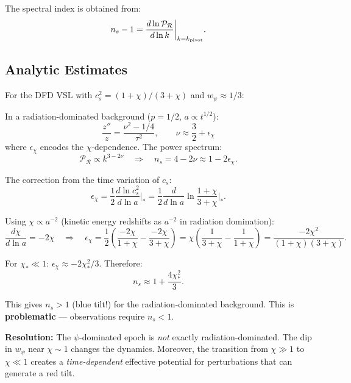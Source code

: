 \documentclass[11pt,a4paper]{article}
\begin{document}
The spectral index is obtained from:
\begin{equation}
n_s - 1 = \frac{d\ln\mathcal{P}_\mathcal{R}}{d\ln k}\bigg|_{k=k_{\rm pivot}}.
\end{equation}

\subsection{Analytic Estimates}

For the DFD VSL with $c_s^2 = (1+\chi)/(3+\chi)$ and $w_\psi \approx 1/3$:

In a radiation-dominated background ($p = 1/2$, $a \propto t^{1/2}$):
\begin{equation}
\frac{z''}{z} = \frac{\nu^2 - 1/4}{\tau^2}, \qquad \nu \approx \frac{3}{2} + \epsilon_\chi
\end{equation}
where $\epsilon_\chi$ encodes the $\chi$-dependence. The power spectrum:
\begin{equation}
\mathcal{P}_\mathcal{R} \propto k^{3-2\nu} \quad \Rightarrow \quad n_s = 4 - 2\nu \approx 1 - 2\epsilon_\chi.
\end{equation}

The correction from the time variation of $c_s$:
\begin{equation}
\epsilon_\chi = \frac{1}{2}\frac{d\ln c_s^2}{d\ln a}\bigg|_* = \frac{1}{2}\frac{d}{d\ln a}\ln\frac{1+\chi}{3+\chi}\bigg|_*.
\end{equation}

Using $\chi \propto a^{-2}$ (kinetic energy redshifts as $a^{-2}$ in radiation domination):
\begin{equation}
\frac{d\chi}{d\ln a} = -2\chi \quad \Rightarrow \quad \epsilon_\chi = \frac{1}{2}\left(\frac{-2\chi}{1+\chi} - \frac{-2\chi}{3+\chi}\right) = \chi\left(\frac{1}{3+\chi} - \frac{1}{1+\chi}\right) = \frac{-2\chi^2}{(1+\chi)(3+\chi)}.
\end{equation}

For $\chi_* \ll 1$: $\epsilon_\chi \approx -2\chi_*^2/3$. Therefore:
\begin{equation}
n_s \approx 1 + \frac{4\chi_*^2}{3}.
\end{equation}

This gives $n_s > 1$ (blue tilt!) for the radiation-dominated background. This is \textbf{problematic} --- observations require $n_s < 1$.

\textbf{Resolution:} The $\psi$-dominated epoch is \emph{not} exactly radiation-dominated. The dip in $w_\psi$ near $\chi \sim 1$ changes the dynamics. Moreover, the transition from $\chi \gg 1$ to $\chi \ll 1$ creates a \emph{time-dependent} effective potential for perturbations that can generate a red tilt.
\end{document}
